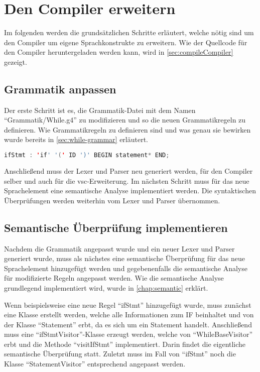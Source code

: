 \section{Den Compiler erweitern} 

Im folgenden werden die grundsätzlichen Schritte erläutert, welche nötig sind um den Compiler um eigene Sprachkonstrukte zu erweitern. Wie der Quellcode für den Compiler heruntergeladen werden kann, wird in \cref{sec:compileCompiler} gezeigt.

\subsection{Grammatik anpassen}
Der erste Schritt ist es, die Grammatik-Datei mit dem Namen \enquote{Grammatik/While.g4} zu modifizieren und so die neuen Grammatikregeln zu definieren. Wie Grammatikregeln zu definieren sind und was genau sie bewirken wurde bereits in \cref{sec:while-grammar} erläutert.  

\begin{lstlisting}[language=java, caption=Grammatikregel für ein IF, label={lst:howto-grammar-if}]
ifStmt : 'if' '(' ID ')' BEGIN statement* END;
\end{lstlisting}

Anschließend muss der Lexer und Parser neu generiert werden, für den Compiler selber und auch für die \ac{vsc}-Erweiterung. Im nächsten Schritt muss für das neue Sprachelement eine semantische Analyse implementiert werden. Die syntaktischen Überprüfungen werden weiterhin vom Lexer und Parser übernommen.


\subsection{Semantische Überprüfung implementieren}
Nachdem die Grammatik angepasst wurde und ein neuer Lexer und Parser generiert wurde, muss als nächstes eine semantische Überprüfung für das neue Sprachelement hinzugefügt werden und gegebenenfalls die semantische Analyse für modifizierte Regeln angepasst werden. Wie die semantische Analyse grundlegend implementiert wird, wurde in \cref{chap:semantic} erklärt.  

Wenn beispielsweise eine neue Regel \enquote{ifStmt} hinzugefügt wurde, muss zunächst eine Klasse erstellt werden, welche alle Informationen zum IF beinhaltet und von der Klasse \enquote{Statement} erbt, da es sich um ein Statement handelt. Anschließend muss eine \enquote{ifStmtVisitor}-Klasse erzeugt werden, welche von \enquote{WhileBaseVisitor} erbt und die Methode \enquote{visitIfStmt} implementiert. Darin findet die eigentliche semantische Überprüfung statt. Zuletzt muss im Fall von \enquote{ifStmt} noch die Klasse \enquote{StatementVisitor} entsprechend angepasst werden.

